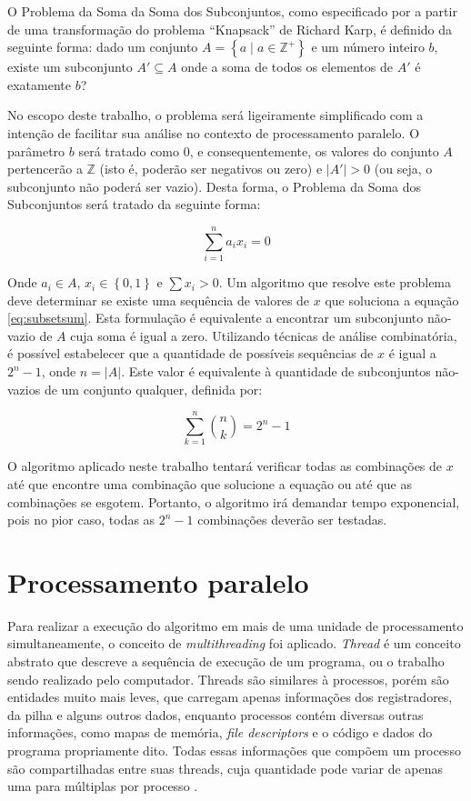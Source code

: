 \documentclass[12pt]{article}
\begin{document}
O Problema da Soma da Soma dos Subconjuntos, como especificado por \cite{Garey1979} a partir de uma transformação do problema ``Knapsack'' de Richard Karp, é definido da seguinte forma: dado um conjunto $A = \left\{a \mid a \in \mathbb{Z}^{+}\right\}$ e um número inteiro $b$, existe um subconjunto $A' \subseteq A$ onde a soma de todos os elementos de $A'$ é exatamente $b$?

No escopo deste trabalho, o problema será ligeiramente simplificado com a intenção de facilitar sua análise no contexto de processamento paralelo. O parâmetro $b$ será tratado como 0, e consequentemente, os valores do conjunto $A$ pertencerão a $\mathbb{Z}$ (isto é, poderão ser negativos ou zero) e $\left | A' \right | > 0$ (ou seja, o subconjunto não poderá ser vazio). Desta forma, o Problema da Soma dos Subconjuntos será tratado da seguinte forma:

\begin{equation} \label{eq:subsetsum}
    \sum_{i = 1}^{n} a_{i} x_{i} = 0
\end{equation}

Onde $a_{i} \in A$, $x_{i} \in \left\{0, 1\right\}$ e $\sum x_{i} > 0$. Um algoritmo que resolve este problema deve determinar se existe uma sequência de valores de $x$ que soluciona a equação \ref{eq:subsetsum}. Esta formulação é equivalente a encontrar um subconjunto não-vazio de $A$ cuja soma é igual a zero. Utilizando técnicas de análise combinatória, é possível estabelecer que a quantidade de possíveis sequências de $x$ é igual a $2^{n} - 1$, onde $n = \left | A \right |$. Este valor é equivalente à quantidade de subconjuntos não-vazios de um conjunto qualquer, definida por:

\begin{equation} \label{eq:subsetcount}
    \sum_{k = 1}^{n} \binom{n}{k} = 2^{n} - 1
\end{equation}

O algoritmo aplicado neste trabalho tentará verificar todas as combinações de $x$ até que encontre uma combinação que solucione a equação ou até que as combinações se esgotem. Portanto, o algoritmo irá demandar tempo exponencial, pois no pior caso, todas as $2^{n} - 1$ combinações deverão ser testadas.

\section{Processamento paralelo} \label{sec:parallel}

Para realizar a execução do algoritmo em mais de uma unidade de processamento simultaneamente, o conceito de \textit{multithreading} foi aplicado. \textit{Thread} é um conceito abstrato que descreve a sequência de execução de um programa, ou o trabalho sendo realizado pelo computador. Threads são similares à processos, porém são entidades muito mais leves, que carregam apenas informações dos registradores, da pilha e alguns outros dados, enquanto processos contém diversas outras informações, como mapas de memória, \textit{file descriptors} e o código e dados do programa propriamente dito. Todas essas informações que compõem um processo são compartilhadas entre suas threads, cuja quantidade pode variar de apenas uma para múltiplas por processo \cite{Lewis1996}.
\end{document}
